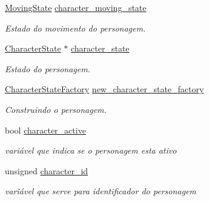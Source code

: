 \begin{DoxyCompactItemize}
\item 
\mbox{\label{classCharacter_afebf14960658d88bd70df4f55de3d334}} 
\mbox{\hyperlink{classCharacter_afbe3b1ceb8e8463b3b66964080149c30}{Moving\+State}} \mbox{\hyperlink{classCharacter_afebf14960658d88bd70df4f55de3d334}{character\+\_\+moving\+\_\+state}}
\begin{DoxyCompactList}\small\item\em Estado do movimento do personagem. \end{DoxyCompactList}\item 
\mbox{\label{classCharacter_a35427d8eb8464ae90149e31262f4dc57}} 
\mbox{\hyperlink{classCharacterState}{Character\+State}} $\ast$ \mbox{\hyperlink{classCharacter_a35427d8eb8464ae90149e31262f4dc57}{character\+\_\+state}}
\begin{DoxyCompactList}\small\item\em Estado do personagem. \end{DoxyCompactList}\item 
\mbox{\label{classCharacter_aa98c4b7a857fdb408cb790fdc1dd33b7}} 
\mbox{\hyperlink{classCharacterStateFactory}{Character\+State\+Factory}} \mbox{\hyperlink{classCharacter_aa98c4b7a857fdb408cb790fdc1dd33b7}{new\+\_\+character\+\_\+state\+\_\+factory}}
\begin{DoxyCompactList}\small\item\em Construindo o personagem. \end{DoxyCompactList}\item 
\mbox{\label{classCharacter_acb93cf49560055ead552c5094a54184c}} 
bool \mbox{\hyperlink{classCharacter_acb93cf49560055ead552c5094a54184c}{character\+\_\+active}}
\begin{DoxyCompactList}\small\item\em variável que indica se o personagem esta ativo \end{DoxyCompactList}\item 
\mbox{\label{classCharacter_ac967fe6670f51494ed141c54e20b1572}} 
unsigned \mbox{\hyperlink{classCharacter_ac967fe6670f51494ed141c54e20b1572}{character\+\_\+id}}
\begin{DoxyCompactList}\small\item\em variável que serve para identificador do personagem \end{DoxyCompactList}\item 

\end{DoxyCompactItemize}
